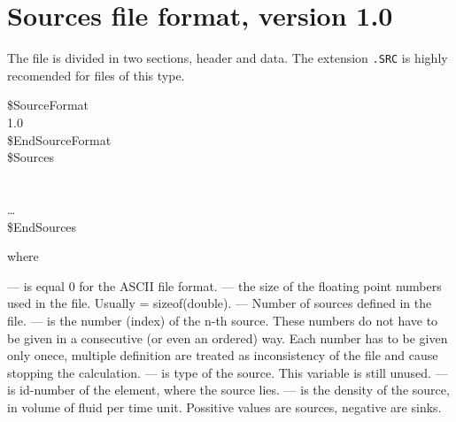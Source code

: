 %
%
%
%

\section*{Sources file format, version 1.0}
The file is divided in two sections, header and data.
The extension {\tt .SRC} is highly recomended for files of this type.
\begin{fileformat}
\$SourceFormat\\
  1.0  \\
\$EndSourceFormat\\
\$Sources\\
  \\
     \\
  \dots\\
\$EndSources\\
\end{fileformat}
where
\begin{description}
  --- is equal 0 for the ASCII file format.
  --- the size of the floating point numbers used in
  the file. Usually  = sizeof(double).
  --- Number of sources defined in the
  file.
  --- is the number (index) of the n-th
  source. These numbers do not have to be given in a consecutive (or even an
  ordered) way. Each number has to be given only onece, multiple definition
  are treated as inconsistency of the file and cause stopping the
  calculation.
  --- is type of the source. This variable is still unused. 
  --- is id-number of the element, where the source lies.
  --- is the density of the source, in volume of fluid
   per time unit. Possitive values are sources, negative are sinks.
\end{description}
